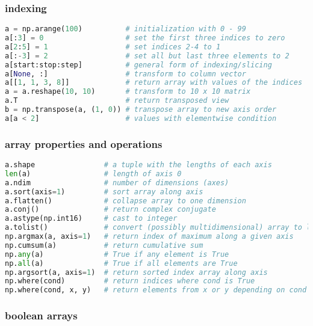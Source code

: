 \documentclass[]{article}
\begin{document}
\subsubsection{indexing}\label{indexing}

\begin{lstlisting}[language=Python]
a = np.arange(100)          # initialization with 0 - 99
a[:3] = 0                   # set the first three indices to zero
a[2:5] = 1                  # set indices 2-4 to 1
a[:-3] = 2                  # set all but last three elements to 2
a[start:stop:step]          # general form of indexing/slicing
a[None, :]                  # transform to column vector
a[[1, 1, 3, 8]]             # return array with values of the indices
a = a.reshape(10, 10)       # transform to 10 x 10 matrix
a.T                         # return transposed view
b = np.transpose(a, (1, 0)) # transpose array to new axis order
a[a < 2]                    # values with elementwise condition
\end{lstlisting}

\subsubsection{array properties and
operations}\label{array-properties-and-operations}

\begin{lstlisting}[language=Python]
a.shape                # a tuple with the lengths of each axis
len(a)                 # length of axis 0
a.ndim                 # number of dimensions (axes)
a.sort(axis=1)         # sort array along axis
a.flatten()            # collapse array to one dimension
a.conj()               # return complex conjugate
a.astype(np.int16)     # cast to integer
a.tolist()             # convert (possibly multidimensional) array to list
np.argmax(a, axis=1)   # return index of maximum along a given axis
np.cumsum(a)           # return cumulative sum
np.any(a)              # True if any element is True
np.all(a)              # True if all elements are True
np.argsort(a, axis=1)  # return sorted index array along axis
np.where(cond)         # return indices where cond is True
np.where(cond, x, y)   # return elements from x or y depending on cond
\end{lstlisting}

\subsubsection{boolean arrays}\label{boolean-arrays}
\end{document}
